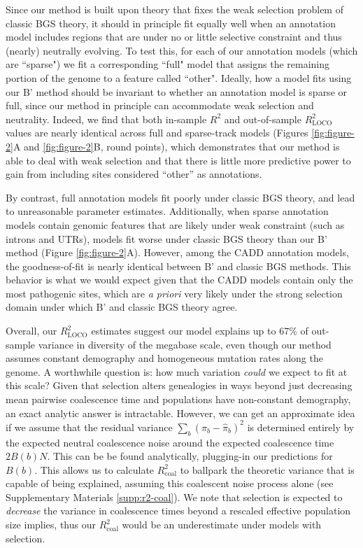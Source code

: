 \documentclass[11pt]{article}
\begin{document}
Since our method is built upon theory that fixes the weak selection problem of
classic BGS theory, it should in principle fit equally well when an annotation
model includes regions that are under no or little selective constraint and thus
(nearly) neutrally evolving. To test this, for each of our annotation models (which are
``sparse") we fit a corresponding ``full" model that assigns the remaining
portion of the genome to a feature called ``other". Ideally, how a model fits
using our B' method should be invariant to whether an annotation model is
sparse or full, since our method in principle can accommodate weak selection
and neutrality. Indeed, we find that both in-sample $R^2$ and
out-of-sample $R_\text{LOCO}^2$ values are nearly identical across full and
sparse-track models (Figures \ref{fig:figure-2}A and \ref{fig:figure-2}B, round
points), which demonstrates that our method is able to deal with weak selection
and that there is little more predictive power to gain from including sites considered ``other'' as annotations. 

By contrast, full annotation models fit poorly under classic BGS theory, and
lead to unreasonable parameter estimates. Additionally, when sparse annotation
models contain genomic features that are likely under weak constraint (such as
introns and UTRs), models fit worse under classic BGS theory than our B' method
(Figure \ref{fig:figure-2}A). However, among the CADD annotation models, the
goodness-of-fit is nearly identical between B' and classic BGS methods. This
behavior is what we would expect given that the CADD models contain only the
most pathogenic sites, which are \emph{a priori} very likely under the strong
selection domain under which B' and classic BGS theory agree.

Overall, our $R_\text{LOCO}^2$ estimates suggest our model
explains up to 67\% of out-sample variance in diversity of the megabase scale,
even though our method assumes constant demography and homogeneous mutation
rates along the genome. A worthwhile question is: how much variation
\emph{could} we expect to fit at this scale? Given that selection alters
genealogies in ways beyond just decreasing mean pairwise coalescence time and
populations have non-constant demography, an exact analytic answer is
intractable. However, we can get an approximate idea if we assume that the
residual variance $\sum_b (\pi_b - \widehat{\pi}_b)^2$ is determined entirely
by the expected neutral coalescence noise around the expected coalescence time
$2B(b)N$. This can be be found analytically, plugging-in our predictions for
$B(b)$. This allows us to calculate $R_\text{coal}^2$ to ballpark the theoretic
variance that is capable of being explained, assuming this coalescent
noise process alone (see Supplementary Materials \ref{supp:r2-coal}). We note that
selection is expected to \emph{decrease} the variance in coalescence times
beyond a rescaled effective population size implies, thus our $R_\text{coal}^2$
would be an underestimate under models with selection.
\end{document}
